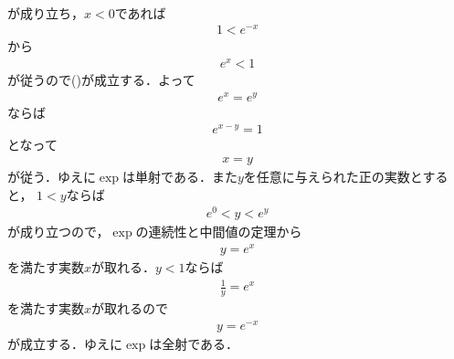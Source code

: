 \begin{sketch}
\begin{align}
		\end{align}
		が成り立ち，$x < 0$であれば
		\begin{align}
			1 < e^{-x}
		\end{align}
		から
		\begin{align}
			e^{x} < 1
		\end{align}
		が従うので()が成立する．よって
		\begin{align}
			e^x = e^y
		\end{align}
		ならば
		\begin{align}
			e^{x - y} = 1
		\end{align}
		となって
		\begin{align}
			x = y
		\end{align}
		が従う．ゆえに$\exp$は単射である．また$y$を任意に与えられた正の実数とすると，
		$1 < y$ならば
		\begin{align}
			e^{0} < y < e^{y}
		\end{align}
		が成り立つので，$\exp$の連続性と中間値の定理から
		\begin{align}
			y = e^{x}
		\end{align}
		を満たす実数$x$が取れる．$y < 1$ならば
		\begin{align}
			\frac{1}{y} = e^{x}
		\end{align}
		を満たす実数$x$が取れるので
		\begin{align}
			y = e^{-x}
		\end{align}
		が成立する．ゆえに$\exp$は全射である．
		\QED
	\end{sketch}